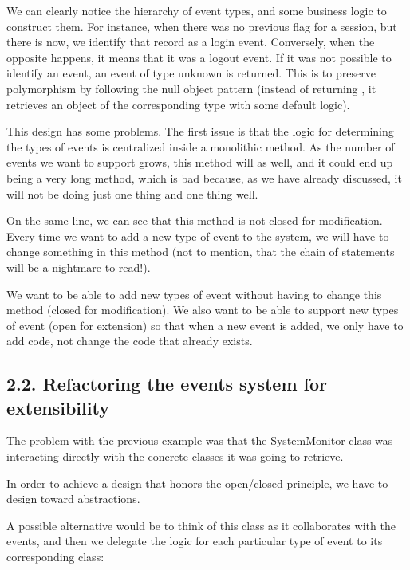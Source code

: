\documentclass[a4paper,10pt,english]{sphinxmanual}
\begin{document}
We can clearly notice the hierarchy of event types, and some business logic to construct
them. For instance, when there was no previous flag for a session, but there is now, we
identify that record as a login event. Conversely, when the opposite happens, it means that
it was a logout event. If it was not possible to identify an event, an event of type unknown
is returned. This is to preserve polymorphism by following the null object pattern (instead
of returning , it retrieves an object of the corresponding type with some default logic).

This design has some problems. The first issue is that the logic for determining the types of
events is centralized inside a monolithic method. As the number of events we want to
support grows, this method will as well, and it could end up being a very long method,
which is bad because, as we have already discussed, it will not be doing just one thing and
one thing well.

On the same line, we can see that this method is not closed for modification. Every time we
want to add a new type of event to the system, we will have to change something in this
method (not to mention, that the chain of  statements will be a nightmare to read!).

We want to be able to add new types of event without having to change this method
(closed for modification). We also want to be able to support new types of event (open for
extension) so that when a new event is added, we only have to add code, not change the
code that already exists.


\subsection{2.2. Refactoring the events system for extensibility}
\label{\detokenize{chapters/4_solid_principles/index:refactoring-the-events-system-for-extensibility}}
The problem with the previous example was that the SystemMonitor class was interacting
directly with the concrete classes it was going to retrieve.

In order to achieve a design that honors the open/closed principle, we have to design
toward abstractions.

A possible alternative would be to think of this class as it collaborates with the events, and
then we delegate the logic for each particular type of event to its corresponding class:

\begin{figure}[H]
\centering

\noindent{}
\end{figure}
\end{document}
